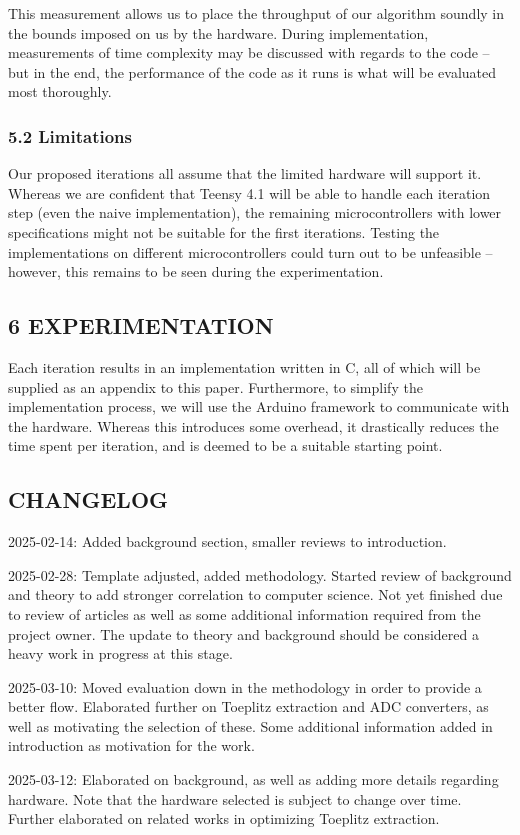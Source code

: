 \documentclass{sigchi}
\begin{document}
This measurement allows us to place the throughput of our algorithm soundly in the bounds imposed on us by the hardware. During implementation, measurements of time complexity may be discussed with regards to the code -- but in the end, the performance of the code as it runs is what will be evaluated most thoroughly.

\subsubsection{5.2 Limitations}\label{limitations}

Our proposed iterations all assume that the limited hardware will support it. Whereas we are confident that Teensy 4.1 will be able to handle each iteration step (even the naive implementation), the remaining microcontrollers with lower specifications might not be suitable for the first iterations. Testing the implementations on different microcontrollers could turn out to be unfeasible -- however, this remains to be seen during the experimentation.

\subsection{6 EXPERIMENTATION}\label{experimentation}

Each iteration results in an implementation written in C, all of which will be supplied as an appendix to this paper. Furthermore, to simplify the implementation process, we will use the Arduino framework to communicate with the hardware. Whereas this introduces some overhead, it drastically reduces the time spent per iteration, and is deemed to be a suitable starting point. \newpage

\subsection{CHANGELOG}\label{changelog}

2025-02-14: Added background section, smaller reviews to introduction.

2025-02-28: Template adjusted, added methodology. Started review of background and theory to add stronger correlation to computer science. Not yet finished due to review of articles as well as some additional information required from the project owner. The update to theory and background should be considered a heavy work in progress at this stage.

2025-03-10: Moved evaluation down in the methodology in order to provide a better flow. Elaborated further on Toeplitz extraction and ADC converters, as well as motivating the selection of these. Some additional information added in introduction as motivation for the work.

2025-03-12: Elaborated on background, as well as adding more details regarding hardware. Note that the hardware selected is subject to change over time. Further elaborated on related works in optimizing Toeplitz extraction.
\balance{}



\end{document}
